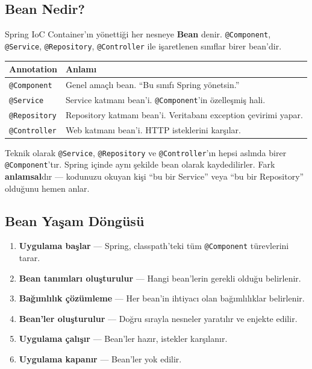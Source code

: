 \documentclass[11pt,a4paper]{article}
\begin{document}
\subsection*{Bean Nedir?}

Spring IoC Container'{\i}n y\"{o}netti\u{g}i her nesneye \textbf{Bean} denir. \texttt{@Component}, \texttt{@Service}, \texttt{@Repository}, \texttt{@Controller} ile i\c{s}aretlenen s{\i}n{\i}flar birer bean'dir.

\begin{center}
\begin{tabular}{lp{8cm}}
\toprule
\textbf{Annotation} & \textbf{Anlam{\i}} \\
\midrule
\texttt{@Component} & Genel ama\c{c}l{\i} bean. ``Bu s{\i}n{\i}f{\i} Spring y\"{o}netsin.'' \\
\texttt{@Service} & Service katman{\i} bean'i. \texttt{@Component}'in \"{o}zelle\c{s}mi\c{s} hali. \\
\texttt{@Repository} & Repository katman{\i} bean'i. Veritaban{\i} exception \c{c}evirimi yapar. \\
\texttt{@Controller} & Web katman{\i} bean'i. HTTP isteklerini kar\c{s}{\i}lar. \\
\bottomrule
\end{tabular}
\end{center}

Teknik olarak \texttt{@Service}, \texttt{@Repository} ve \texttt{@Controller}'{\i}n hepsi asl{\i}nda birer \texttt{@Component}'t{\i}r. Spring i\c{c}inde ayn{\i} \c{s}ekilde bean olarak kaydedilirler. Fark \textbf{anlamsal}d{\i}r --- kodunuzu okuyan ki\c{s}i ``bu bir Service'' veya ``bu bir Repository'' oldu\u{g}unu hemen anlar.

\subsection*{Bean Ya\c{s}am D\"{o}ng\"{u}s\"{u}}

\begin{enumerate}
    \item \textbf{Uygulama ba\c{s}lar} --- Spring, classpath'teki t\"{u}m \texttt{@Component} t\"{u}revlerini tarar.
    \item \textbf{Bean tan{\i}mlar{\i} olu\c{s}turulur} --- Hangi bean'lerin gerekli oldu\u{g}u belirlenir.
    \item \textbf{Ba\u{g}{\i}ml{\i}l{\i}k \c{c}\"{o}z\"{u}mleme} --- Her bean'in ihtiyac{\i} olan ba\u{g}{\i}ml{\i}l{\i}klar belirlenir.
    \item \textbf{Bean'ler olu\c{s}turulur} --- Do\u{g}ru s{\i}rayla nesneler yarat{\i}l{\i}r ve enjekte edilir.
    \item \textbf{Uygulama \c{c}al{\i}\c{s}{\i}r} --- Bean'ler haz{\i}r, istekler kar\c{s}{\i}lan{\i}r.
    \item \textbf{Uygulama kapan{\i}r} --- Bean'ler yok edilir.
\end{enumerate}
\end{document}
